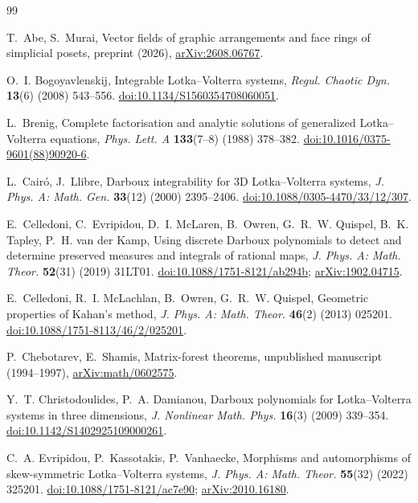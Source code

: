 \documentclass[11pt,a4paper]{article}
\theoremstyle{definition}
\theoremstyle{remark}
\begin{document}
\begin{thebibliography}{99}\small

 T.~Abe, S.~Murai, Vector fields of graphic arrangements and face rings of simplicial posets, preprint (2026), \href{https://arxiv.org/abs/2608.06767}{arXiv:2608.06767}.

 O.~I. Bogoyavlenskij, Integrable Lotka--Volterra systems, \emph{Regul. Chaotic Dyn.} \textbf{13}(6) (2008) 543--556. \href{https://doi.org/10.1134/S1560354708060051}{doi:10.1134/S1560354708060051}.

 L.~Brenig, Complete factorisation and analytic solutions of generalized Lotka--Volterra equations, \emph{Phys. Lett. A} \textbf{133}(7--8) (1988) 378--382. \href{https://doi.org/10.1016/0375-9601(88)90920-6}{doi:10.1016/0375-9601(88)90920-6}.

 L.~Cair\'o, J.~Llibre, Darboux integrability for 3D Lotka--Volterra systems, \emph{J. Phys. A: Math. Gen.} \textbf{33}(12) (2000) 2395--2406. \href{https://doi.org/10.1088/0305-4470/33/12/307}{doi:10.1088/0305-4470/33/12/307}.

 E.~Celledoni, C.~Evripidou, D.~I. McLaren, B.~Owren, G.~R.~W. Quispel, B.~K. Tapley, P.~H. van der Kamp, Using discrete Darboux polynomials to detect and determine preserved measures and integrals of rational maps, \emph{J. Phys. A: Math. Theor.} \textbf{52}(31) (2019) 31LT01. \href{https://doi.org/10.1088/1751-8121/ab294b}{doi:10.1088/1751-8121/ab294b}; \href{https://arxiv.org/abs/1902.04715}{arXiv:1902.04715}.

 E.~Celledoni, R.~I. McLachlan, B.~Owren, G.~R.~W. Quispel, Geometric properties of Kahan's method, \emph{J. Phys. A: Math. Theor.} \textbf{46}(2) (2013) 025201. \href{https://doi.org/10.1088/1751-8113/46/2/025201}{doi:10.1088/1751-8113/46/2/025201}.

 P.~Chebotarev, E.~Shamis, Matrix-forest theorems, unpublished manuscript (1994--1997), \href{https://arxiv.org/abs/math/0602575}{arXiv:math/0602575}.

 Y.~T. Christodoulides, P.~A. Damianou, Darboux polynomials for Lotka--Volterra systems in three dimensions, \emph{J. Nonlinear Math. Phys.} \textbf{16}(3) (2009) 339--354. \href{https://doi.org/10.1142/S1402925109000261}{doi:10.1142/S1402925109000261}.

 C.~A. Evripidou, P.~Kassotakis, P.~Vanhaecke, Morphisms and automorphisms of skew-symmetric Lotka--Volterra systems, \emph{J. Phys. A: Math. Theor.} \textbf{55}(32) (2022) 325201. \href{https://doi.org/10.1088/1751-8121/ac7e90}{doi:10.1088/1751-8121/ac7e90}; \href{https://arxiv.org/abs/2010.16180}{arXiv:2010.16180}.


\end{thebibliography}
\end{document}
